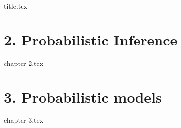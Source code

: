 \documentclass[a4paper,11pt]{book}
\begin{document}
\frontmatter
{title.tex}

\clearpage
\thispagestyle{empty}

\tableofcontents

\mainmatter
{}
\chapter*{2. Probabilistic Inference}
{chapter 2.tex}

\chapter*{3. Probabilistic models}
{chapter 3.tex}

\backmatter
\end{document}
